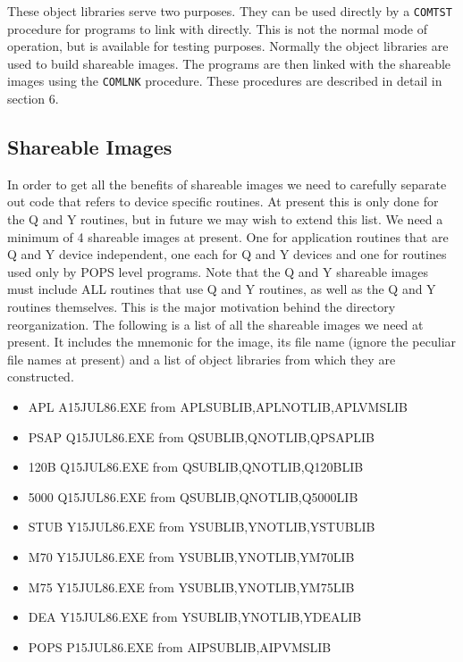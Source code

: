 These object libraries serve two purposes. They can be used directly by
a {\tt COMTST} procedure for programs to link with directly. This is not the
normal mode of operation, but is available for testing purposes.
Normally the object libraries are used to build shareable images. The
programs are then linked with the shareable images using the {\tt COMLNK}
procedure.  These procedures are described in detail in section 6.

\subsection{ Shareable Images}

In order to get all the benefits of shareable images we need to
carefully separate out code that refers to device specific routines. At
present this is only done for the Q and Y routines, but in future we may
wish to extend this list. We need a minimum of 4 shareable images at
present.  One for application routines that are Q and Y device
independent, one each for Q and Y devices and one for routines used only
by POPS level programs. Note that the Q and Y shareable images must
include ALL routines that use Q and Y routines, as well as the Q and Y
routines themselves. This is the major motivation behind the directory
reorganization. The following is a list of all the shareable images we
need at present. It includes the mnemonic for the image, its file name
(ignore the peculiar file names at present) and a list of object
libraries from which they are constructed.

\begin{itemize}
  \item{APL	A15JUL86.EXE	from APLSUBLIB,APLNOTLIB,APLVMSLIB}

  \item{PSAP	Q15JUL86.EXE	from QSUBLIB,QNOTLIB,QPSAPLIB}
  \item{120B	Q15JUL86.EXE	from QSUBLIB,QNOTLIB,Q120BLIB}
  \item{5000	Q15JUL86.EXE	from QSUBLIB,QNOTLIB,Q5000LIB}

  \item{STUB	Y15JUL86.EXE	from YSUBLIB,YNOTLIB,YSTUBLIB}
  \item{M70 	Y15JUL86.EXE	from YSUBLIB,YNOTLIB,YM70LIB}
  \item{M75 	Y15JUL86.EXE	from YSUBLIB,YNOTLIB,YM75LIB}
  \item{DEA 	Y15JUL86.EXE	from YSUBLIB,YNOTLIB,YDEALIB}

  \item{POPS	P15JUL86.EXE	from AIPSUBLIB,AIPVMSLIB}
\end{itemize}

